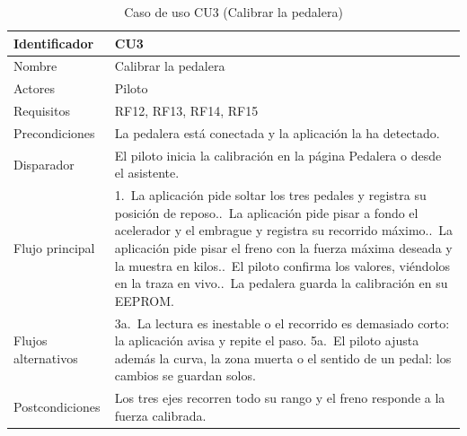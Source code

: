 \clearpage   %
\begin{table}[H]
	\centering
	\renewcommand{\arraystretch}{1.5}
	\begin{tabular}{|l|p{10cm}|}
		\hline
		Identificador & CU3 \\
		\hline
		Nombre & Calibrar la pedalera \\
		\hline
		Actores & Piloto \\
		\hline
		Requisitos & RF12, RF13, RF14, RF15 \\
		\hline
		Precondiciones & La pedalera está conectada y la aplicación la ha detectado. \\
		\hline
		Disparador & El piloto inicia la calibración en la página Pedalera o desde el asistente. \\
		\hline
		Flujo principal & 1.~La aplicación pide soltar los tres pedales y registra su posición de reposo.\newline
		2.~La aplicación pide pisar a fondo el acelerador y el embrague y registra su recorrido máximo.\newline
		3.~La aplicación pide pisar el freno con la fuerza máxima deseada y la muestra en kilos.\newline
		4.~El piloto confirma los valores, viéndolos en la traza en vivo.\newline
		5.~La pedalera guarda la calibración en su EEPROM. \\
		\hline
		Flujos alternativos & 3a.~La lectura es inestable o el recorrido es demasiado corto: la aplicación avisa y repite el paso.\newline
		5a.~El piloto ajusta además la curva, la zona muerta o el sentido de un pedal: los cambios se guardan solos. \\
		\hline
		Postcondiciones & Los tres ejes recorren todo su rango y el freno responde a la fuerza calibrada. \\
		\hline
	\end{tabular}
	\caption{Caso de uso CU3 (Calibrar la pedalera)}
	\label{tab:cu3}
\end{table}

